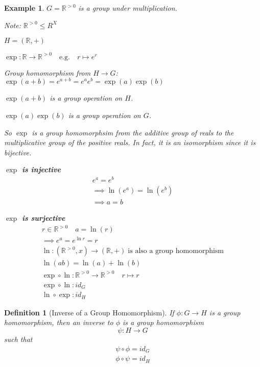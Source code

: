 \documentclass[11pt, oneside]{book}
\theoremstyle{break}
\newtheorem{defn}{Definition}[section]
\newtheorem{eg}{Example}[section]
\newcommand{\bb}[1]{\mathbb{#1}}			%
\begin{document}
\begin{eg}
   $G = \bb{R}^{> 0}$ is a group under multiplication.

   Note: $\bb{R}^{> 0} \leq R^X$

   $H = (\bb{R}, +)$

   $\exp: \bb{R} \to \bb{R}^{> 0} \quad \text{e.g.} \quad r \mapsto e^r$

   Group homomorphism from $H \to G$: $\exp(a + b) = e^{a + b} = e^a e^b = \exp(a)\exp(b)$

   $\exp(a + b)$ is a group operation on $H$.

   $\exp(a)\exp(b)$ is a group operation on $G$.

   So $\exp$ is a group homomorphsim from the additive group of reals to the multiplicative group of the positive reals. In fact, it is an isomorphism since it is bijective.

   \textbf{\textit{$\exp$ is injective}}
   \begin{gather*}
       e^a = e^b \\
       \implies \ln(e^a) = \ln(e^b) \\
       \implies a = b
   \end{gather*}

   \textbf{\textit{$\exp$ is surjective}}
   \begin{gather*}
       r \in \bb{R}^{ > 0} \quad a = \ln(r) \\
       \implies e^a = e^{\ln r} = r \\
       \ln: (\bb{R}^{> 0}, x) \to (\bb{R}, +) \; \text{is also a group homomorphism} \\
       \ln(ab) = \ln(a) + \ln(b) \\
       \exp \circ \ln : \bb{R}^{> 0} \to \bb{R}^{> 0} \quad r \mapsto r \\
       \exp \circ \ln : id_G \\
       \ln \circ \exp : id_H
   \end{gather*}
\end{eg}

\begin{defn}[Inverse of a Group Homomorphism]
    If $\phi : G \to H$ is a group homomorphism, then an inverse to $\phi$ is a group homomorphism
    \begin{equation}
        \psi: H \to G
    \end{equation}
    such that
    \begin{align*}
        \psi \circ \phi = id_G \\
        \phi \circ \psi = id_H
    \end{align*}
\end{defn}
\end{document}
